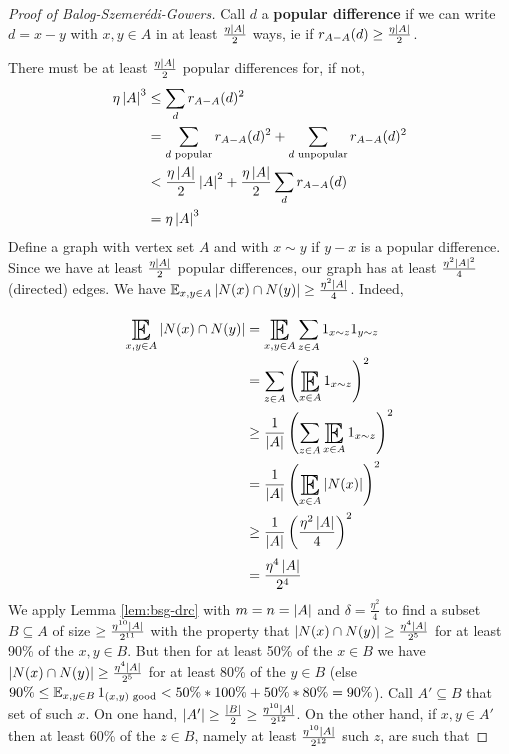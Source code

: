 \documentclass{article}
\begin{document}
\begin{proof}[Proof of Balog-Szemerédi-Gowers]
  Call $d$ a {\bf popular difference} if we can write $d = x - y$ with $x, y \in A$ in at least $\frac{\eta\left\lvert A\right\rvert}2$ ways, ie if $r_{A - A}(d) \ge \frac{\eta\left\lvert A\right\rvert}2$.

  There must be at least $\frac{\eta\left\lvert A\right\rvert}2$ popular differences for, if not,
  \begin{align*}
    \eta\left\lvert A\right\rvert^3
    & \le \sum_d r_{A - A}(d)^2 \\
    & = \sum_{d\text{ popular}} r_{A - A}(d)^2 + \sum_{d\text{ unpopular}} r_{A - A}(d)^2 \\
    & < \frac{\eta\left\lvert A\right\rvert}2 \left\lvert A\right\rvert^2 + \frac{\eta\left\lvert A\right\rvert}2\sum_d r_{A - A}(d) \\
    & = \eta\left\lvert A\right\rvert^3 
  \end{align*}
  Define a graph with vertex set $A$ and with $x \sim y$ if $y - x$ is a popular difference. Since we have at least $\frac{\eta\left\lvert A\right\rvert}2$ popular differences, our graph has at least $\frac{\eta^2\left\lvert A\right\rvert^2}4$ (directed) edges. We have $\E_{x, y \in A} \abs{N(x) \inter N(y)} \ge \frac{\eta^2\abs A}4$. Indeed,
  \begin{align*}
    \E_{x, y \in A} \abs{N(x) \inter N(y)}
    & = \E_{x, y \in A} \sum_{z \in A} 1_{x \sim z} 1_{y \sim z} \\
    & = \sum_{z \in A} \left(\E_{x \in A} 1_{x \sim z}\right)^2 \\
    & \ge \frac 1{\abs A} \left(\sum_{z \in A} \E_{x \in A} 1_{x \sim z}\right)^2 \\
    & = \frac 1{\abs A} \left(\E_{x \in A} \abs{N(x)}\right)^2 \\
    & \ge \frac 1{\abs A} \left(\frac{\eta^2\abs A}4\right)^2 \\
    & = \frac{\eta^4\abs A}{2^4}
  \end{align*}
  We apply Lemma \ref{lem:bsg-drc} with $m = n = \left\lvert A\right\rvert$ and $\delta = \frac{\eta^2}4$ to find a subset $B \subseteq A$ of size $\ge \frac{\eta^{10}\left\lvert A\right\rvert}{2^{11}}$ with the property that $\left\lvert N(x) \cap N(y)\right\rvert \ge \frac{\eta^4\left\lvert A\right\rvert}{2^5}$ for at least 90\% of the $x, y \in B$. But then for at least 50\% of the $x \in B$ we have $\left\lvert N(x) \cap N(y)\right\rvert \ge \frac{\eta^4\left\lvert A\right\rvert}{2^5}$ for at least 80\% of the $y \in B$ (else $90\% \le \E_{x, y \in B} 1_{(x, y)\text{ good}} < 50\% * 100\% + 50\% * 80\% = 90\%$). Call $A' \subseteq B$ that set of such $x$. On one hand, $\left\lvert A'\right\rvert \ge \frac{\left\lvert B\right\rvert}2 \ge \frac{\eta^{10}\left\lvert A\right\rvert}{2^{12}}$. On the other hand, if $x, y \in A'$ then at least 60\% of the $z \in B$, namely at least $\frac{\eta^{10}\left\lvert A\right\rvert}{2^{12}}$ such $z$, are such that

\end{proof}
\end{document}
